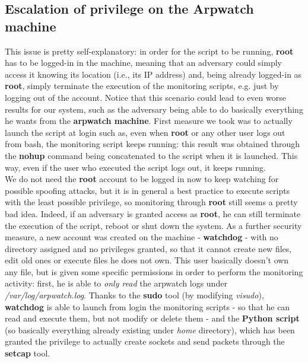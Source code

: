 \subsection{Escalation of privilege on the Arpwatch machine}
This issue is pretty self-explanatory: in order for the script to be running, \textbf{root} has to be logged-in in the machine, meaning that an adversary could simply access it knowing its location (i.e., its IP address) and, being already logged-in as \textbf{root}, simply terminate the execution of the monitoring scripts, e.g. just by logging out of the account. Notice that this scenario could lead to even worse results for our system, such as the adversary being able to do basically everything he wants from the \textbf{arpwatch machine}. First measure we took was to actually launch the script at login such as, even when \textbf{root} or any other user logs out from bash, the monitoring script keeps running: this result was obtained through the \textbf{nohup} command being concatenated to the script when it is launched. This way, even if the user who executed the script logs out, it keeps running.\\
We do not need the \textbf{root} account to be logged in now to keep watching for possible spoofing attacks, but it is in general a best practice to execute scripts with the least possible privilege, so monitoring through \textbf{root} still seems a pretty bad idea. Indeed, if an adversary is granted access as \textbf{root}, he can still terminate the execution of the script, reboot or shut down the system. As a further security measure, a new account was created on the machine - \textbf{watchdog} - with no directory assigned and no privileges granted, so that it cannot create new files, edit old ones or execute files he does not own. This user basically doesn't own any file, but is given some specific permissions in order to perform the monitoring activity: first, he is able to \textit{only read} the arpwatch logs under \textit{/var/log/arpwatch.log}. Thanks to the \textbf{sudo} tool (by modifying \textit{visudo}), \textbf{watchdog} is able to launch from login the monitoring scripts - so that he can read and execute them, but not modify or delete them - and the \textbf{Python script} (so basically everything already existing under \textit{home} directory), which has been granted the privilege to actually create sockets and send packets through the \textbf{setcap} tool.\\
